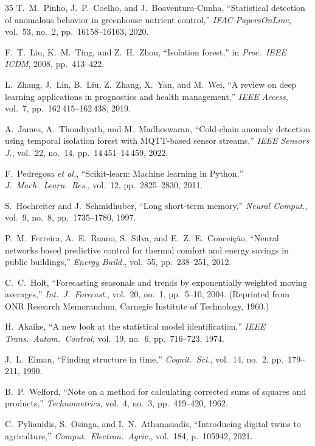 \documentclass[journal,10pt,twocolumn]{IEEEtran}
\begin{document}
\begin{thebibliography}{35}
T.~M.~Pinho, J.~P.~Coelho, and J.~Boaventura-Cunha, ``Statistical
detection of anomalous behavior in greenhouse nutrient control,''
\emph{IFAC-PapersOnLine}, vol.~53, no.~2, pp.~16158--16163, 2020.

F.~T.~Liu, K.~M.~Ting, and Z.~H.~Zhou, ``Isolation forest,'' in
\emph{Proc.\ IEEE ICDM}, 2008, pp.~413--422.

L.~Zhang, J.~Lin, B.~Liu, Z.~Zhang, X.~Yan, and M.~Wei, ``A review
on deep learning applications in prognostics and health management,''
\emph{IEEE Access}, vol.~7, pp.~162\,415--162\,438, 2019.

A.~James, A.~Thondiyath, and M.~Madheswaran, ``Cold-chain anomaly
detection using temporal isolation forest with MQTT-based sensor
streams,'' \emph{IEEE Sensors J.}, vol.~22, no.~14,
pp.~14\,451--14\,459, 2022.

F.~Pedregosa \emph{et al.}, ``Scikit-learn: Machine learning in
Python,'' \emph{J.\ Mach.\ Learn.\ Res.}, vol.~12,
pp.~2825--2830, 2011.

S.~Hochreiter and J.~Schmidhuber, ``Long short-term memory,''
\emph{Neural Comput.}, vol.~9, no.~8, pp.~1735--1780, 1997.

P.~M.~Ferreira, A.~E.~Ruano, S.~Silva, and E.~Z.~E.~Conceição,
``Neural networks based predictive control for thermal comfort and
energy savings in public buildings,'' \emph{Energy Build.}, vol.~55,
pp.~238--251, 2012.

C.~C.~Holt, ``Forecasting seasonals and trends by exponentially
weighted moving averages,'' \emph{Int.\ J.\ Forecast.}, vol.~20,
no.~1, pp.~5--10, 2004. (Reprinted from ONR Research Memorandum,
Carnegie Institute of Technology, 1960.)

H.~Akaike, ``A new look at the statistical model identification,''
\emph{IEEE Trans.\ Autom.\ Control}, vol.~19, no.~6,
pp.~716--723, 1974.

J.~L.~Elman, ``Finding structure in time,'' \emph{Cognit.\ Sci.},
vol.~14, no.~2, pp.~179--211, 1990.

B.~P.~Welford, ``Note on a method for calculating corrected sums of
squares and products,'' \emph{Technometrics}, vol.~4, no.~3,
pp.~419--420, 1962.

C.~Pylianidis, S.~Osinga, and I.~N.~Athanasiadis, ``Introducing
digital twins to agriculture,'' \emph{Comput.\ Electron.\ Agric.},
vol.~184, p.~105942, 2021.


\end{thebibliography}
\end{document}
